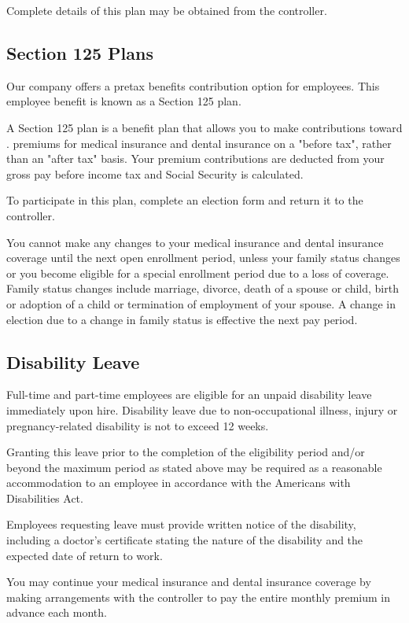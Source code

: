 Complete details of this plan may be obtained from the controller.

\subsection{Section 125 Plans}

Our company offers a pretax benefits contribution option for employees. This employee benefit is known as a Section 125 plan.

A Section 125 plan is a benefit plan that allows you to make contributions toward . premiums for medical insurance and dental insurance on a "before tax", rather than an "after tax" basis. Your premium contributions are deducted from your gross pay before income tax and Social Security is calculated.

To participate in this plan, complete an election form and return it to the controller.

You cannot make any changes to your medical insurance and dental insurance coverage until the next open enrollment period, unless your family status changes or you become eligible for a special enrollment period due to a loss of coverage. Family status changes include marriage, divorce, death of a spouse or child, birth or adoption of a child or termination of employment of your spouse. A change in election due to a change in family status is effective the next pay period.

\subsection{Disability Leave}

Full-time and part-time employees are eligible for an unpaid disability leave immediately upon hire. Disability leave due to non-occupational illness, injury or pregnancy-related disability is not to exceed 12 weeks.

Granting this leave prior to the completion of the eligibility period and/or beyond the maximum period as stated above may be required as a reasonable accommodation to an employee in accordance with the Americans with Disabilities Act.

Employees requesting leave must provide written notice of the disability, including a doctor's certificate stating the nature of the disability and the expected date of return to work.

You may continue your medical insurance and dental insurance coverage by making arrangements with the controller to pay the entire monthly premium in advance each month.

